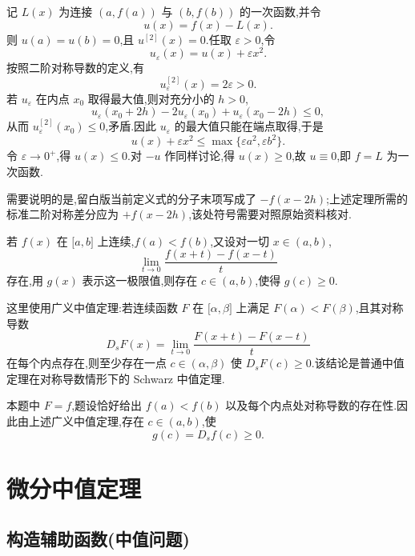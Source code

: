 \begin{solution}
    记 $L(x)$ 为连接 $(a,f(a))$ 与 $(b,f(b))$ 的一次函数,并令
    \[
        u(x)=f(x)-L(x).
    \]
    则 $u(a)=u(b)=0$,且 $u^{[2]}(x)=0$.任取 $\varepsilon>0$,令
    \[
        u_{\varepsilon}(x)=u(x)+\varepsilon x^2.
    \]
    按照二阶对称导数的定义,有
    \[
        u_{\varepsilon}^{[2]}(x)=2\varepsilon>0.
    \]
    若 $u_{\varepsilon}$ 在内点 $x_0$ 取得最大值,则对充分小的 $h>0$,
    \[
        u_{\varepsilon}(x_0+2h)-2u_{\varepsilon}(x_0)
        +u_{\varepsilon}(x_0-2h)\leq0,
    \]
    从而 $u_{\varepsilon}^{[2]}(x_0)\leq0$,矛盾.因此 $u_{\varepsilon}$ 的最大值只能在端点取得,于是
    \[
        u(x)+\varepsilon x^2
        \leq\max\{\varepsilon a^2,\varepsilon b^2\}.
    \]
    令 $\varepsilon\to0^+$,得 $u(x)\leq0$.对 $-u$ 作同样讨论,得 $u(x)\geq0$,故 $u\equiv0$,即 $f=L$ 为一次函数.

    需要说明的是,留白版当前定义式的分子末项写成了 $-f(x-2h)$;上述定理所需的标准二阶对称差分应为 $+f(x-2h)$,该处符号需要对照原始资料核对.
\end{solution}

\begin{example}
    若 $f(x)$ 在 $\lbrack a,b\rbrack$ 上连续,$f(a)<f(b)$,又设对一切 $x\in(a,b)$,
    \[
        \lim\limits_{t\to0}\dfrac{f(x+t)-f(x-t)}{t}
    \]
    存在,用 $g(x)$ 表示这一极限值,则存在 $c\in(a,b)$,使得 $g(c)\geq0$.
\end{example}
\exampleblank

\begin{solution}
    这里使用广义中值定理:若连续函数 $F$ 在 $\lbrack\alpha,\beta\rbrack$ 上满足 $F(\alpha)<F(\beta)$,且其对称导数
    \[
        D_sF(x)=\lim\limits_{t\to0}\dfrac{F(x+t)-F(x-t)}{t}
    \]
    在每个内点存在,则至少存在一点 $c\in(\alpha,\beta)$ 使 $D_sF(c)\geq0$.该结论是普通中值定理在对称导数情形下的 Schwarz 中值定理.

    本题中 $F=f$,题设恰好给出 $f(a)<f(b)$ 以及每个内点处对称导数的存在性.因此由上述广义中值定理,存在 $c\in(a,b)$,使
    \[
        g(c)=D_sf(c)\geq0.
    \]
\end{solution}


\newpage

\section{微分中值定理}


\subsection{构造辅助函数(中值问题)}

